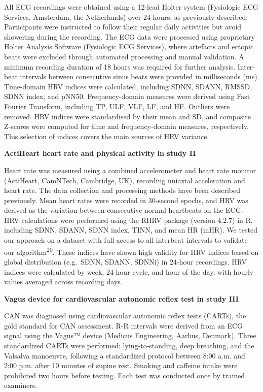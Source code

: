 \documentclass[
  a4paper,
  headsepline=true,
  open=any]{scrbook}
\begin{document}
All ECG recordings were obtained using a 12-lead Holter system
(Fysiologic ECG Services, Amsterdam, the Netherlands) over 24 hours, as
previously described. Participants were instructed to follow their
regular daily activities but avoid showering during the recording. The
ECG data were processed using proprietary Holter Analysis Software
(Fysiologic ECG Services), where artefacts and ectopic beats were
excluded through automated processing and manual validation. A minimum
recording duration of 18 hours was required for further analysis.
Inter-beat intervals between consecutive sinus beats were provided in
milliseconds (ms). Time-domain HRV indices were calculated, including
SDNN, SDANN, RMSSD, SDNN index, and pNN50. Frequency-domain measures
were derived using Fast Fourier Transform, including TP, ULF, VLF, LF,
and HF. Outliers were removed. HRV indices were standardised by their
mean and SD, and composite Z-scores were computed for time and
frequency-domain measures, respectively. This selection of indices
covers the main sources of HRV variance.

\textbf{ActiHeart heart rate and physical activity in study II}

Heart rate was measured using a combined accelerometer and heart rate
monitor (ActiHeart, CamNTech, Cambridge, UK), recording uniaxial
acceleration and heart rate. The data collection and processing methods
have been described previously. Mean heart rates were recorded in
30-second epochs, and HRV was derived as the variation between
consecutive normal heartbeats on the ECG. HRV calculations were
performed using the RHRV package (version 4.2.7) in R, including SDNN,
SDANN, SDNN index, TINN, and mean HR (mHR). We tested our approach on a
dataset with full access to all interbeat intervals to validate our
algorithm\textsuperscript{20}. These indices have shown high validity
for HRV indices based on global distribution (e.g.~SDNN, SDANN, SDNNi)
in 24-hour recordings. HRV indices were calculated by week, 24-hour
cycle, and hour of the day, with hourly values averaged across recording
days.

\textbf{Vagus device for cardiovascular autonomic reflex test in study
III}

CAN was diagnosed using cardiovascular autonomic reflex tests (CARTs),
the gold standard for CAN assessment. R-R intervals were derived from an
ECG signal using the Vagus™ device (Medicus Engineering, Aarhus,
Denmark). Three standardized CARTs were performed: lying-to-standing,
deep breathing, and the Valsalva manoeuvre, following a standardized
protocol between 8:00 a.m. and 2:00 p.m. after 10 minutes of supine
rest. Smoking and caffeine intake were prohibited two hours before
testing. Each test was conducted once by trained examiners.
\end{document}
